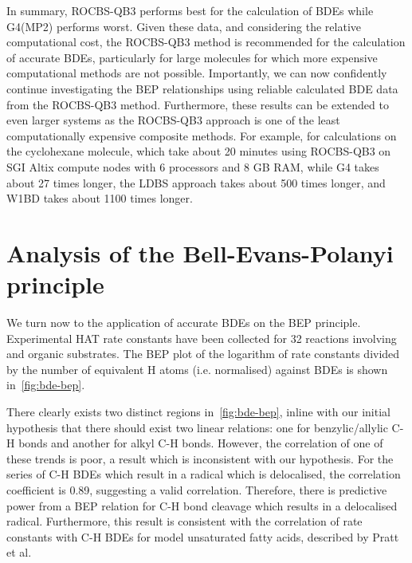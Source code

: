 In summary, ROCBS-QB3 performs best for the calculation of  BDEs while G4(MP2) performs worst. Given these data, and considering the relative computational cost, the ROCBS-QB3 method is recommended for the calculation of accurate BDEs, particularly for large molecules for which more expensive computational methods are not possible. Importantly, we can now confidently continue investigating the BEP relationships using reliable calculated BDE data from the ROCBS-QB3 method. Furthermore, these results can be extended to even larger systems as the ROCBS-QB3 approach is one of the least computationally expensive composite methods. For example, for calculations on the cyclohexane molecule, which take about 20 minutes using ROCBS-QB3 on SGI Altix compute nodes with 6 processors and 8 GB RAM, while G4 takes about 27 times longer, the LDBS approach takes about 500 times longer, and W1BD takes about 1100 times longer.

\section{Analysis of the Bell-Evans-Polanyi principle}

We turn now to the application of accurate BDEs on the BEP principle. Experimental HAT rate constants have been collected for 32 reactions involving \cumo and organic substrates. The BEP plot of the logarithm of rate constants divided by the number of equivalent H atoms (i.e. normalised) against BDEs is shown in~\ref{fig:bde-bep}.

There clearly exists two distinct regions in~\ref{fig:bde-bep}, inline with our initial hypothesis that there should exist two linear relations: one for benzylic/allylic C-H bonds and another for alkyl C-H bonds. However, the correlation of one of these trends is poor, a result which is inconsistent with our hypothesis. For the series of C-H BDEs which result in a radical which is delocalised, the correlation coefficient is 0.89, suggesting a valid correlation. Therefore, there is predictive power from a BEP relation for C-H bond cleavage which results in a delocalised radical. Furthermore, this result is consistent with the correlation of rate constants with C-H BDEs for model unsaturated fatty acids, described by Pratt et al.\cite{Pratt2003}

